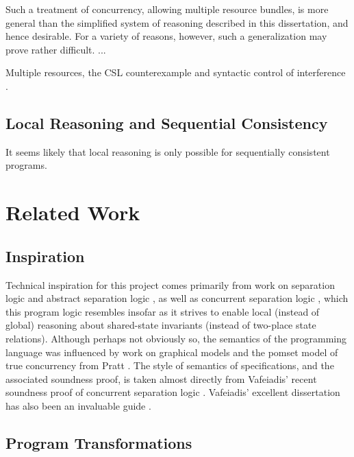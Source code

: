 \documentclass[11pt]{report}
\begin{document}
Such a treatment of concurrency, allowing multiple resource bundles, is more general than the simplified system of reasoning described in this dissertation, and hence desirable. For a variety of reasons, however, such a generalization may prove rather difficult. ... 

Multiple resources, the CSL counterexample \cite{Brookes20115} and syntactic control of interference \cite{DBLP:conf/popl/ReddyR12}.  

\section{Local Reasoning and Sequential Consistency}

It seems likely that local reasoning is only possible for sequentially consistent programs. 

\chapter{Related Work}

\section{Inspiration}

Technical inspiration for this project comes primarily from work on separation logic \cite{DBLP:conf/lics/Reynolds02,DBLP:conf/csl/OHearnRY01,DBLP:journals/bsl/OHearnP99} and abstract separation logic \cite{DBLP:conf/lics/CalcagnoOY07}, as well as concurrent separation logic  \cite{DBLP:journals/tcs/OHearn07,DBLP:journals/tcs/Brookes07}, which this program logic resembles insofar as it strives to enable local (instead of global) reasoning about shared-state invariants (instead of two-place state relations). Although perhaps not obviously so, the semantics of the programming language was influenced by work on graphical models \cite{DBLP:journals/ipl/WehrmanHO09,DBLP:conf/RelMiCS/HoareMSW09,DBLP:journals/jlp/HoareMSW11} and the pomset model of true concurrency from Pratt \cite{DBLP:conf/popl/Pratt82,DBLP:conf/concur/Pratt84}. The style of semantics of specifications, and the associated soundness proof, is taken almost directly from Vafeiadis' recent soundness proof of concurrent separation logic \cite{V11}. Vafeiadis' excellent dissertation has also been an invaluable guide \cite{VafeiadisDissertation}. 

\section{Program Transformations}
\end{document}
